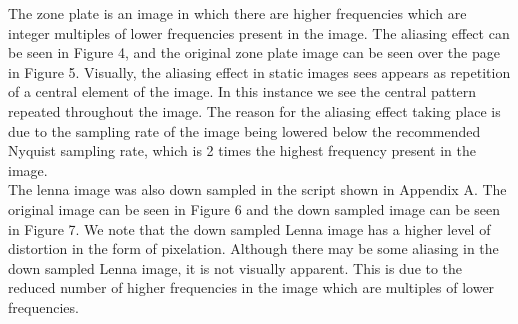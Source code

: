 \documentclass{article}
\begin{document}
The zone plate is an image in which there are higher frequencies which are integer multiples of lower frequencies present in the image. The aliasing effect can be seen in Figure 4, and the original zone plate image can be seen over the page in Figure 5. Visually, the aliasing effect in static images sees appears as repetition of a central element of the image. In this instance we see the central pattern repeated throughout the image. The reason for the aliasing effect taking place is due to the sampling rate of the image being lowered below the recommended Nyquist sampling rate, which is 2 times the highest frequency present in the image.\\

The lenna image was also down sampled in the script shown in Appendix A. The original image can be seen in Figure 6 and the down sampled image can be seen in Figure 7. We note that the down sampled Lenna image has a higher level of distortion in the form of pixelation. Although there may be some aliasing in the down sampled Lenna image, it is not visually apparent. This is due to the reduced number of higher frequencies in the image which are multiples of lower frequencies.
\end{document}
